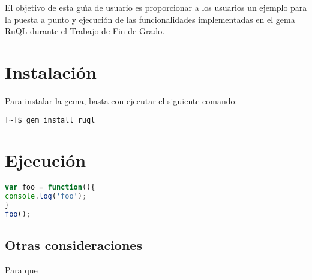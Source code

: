 El objetivo de esta gu\'{\i}a de usuario es proporcionar a los usuarios un ejemplo para la puesta a punto y ejecuci\'on de las 
funcionalidades implementadas en el gema RuQL durante el Trabajo de Fin de Grado.

\section{Instalación}
\label{Apendice2:instalacion}

Para instalar la gema, basta con ejecutar el siguiente comando:
\begin{verbatim}
[~]$ gem install ruql
\end{verbatim}



\section{Ejecución}
\label{Apendice2:ejecucion}

\begin{lstlisting}[language=JavaScript]
var foo = function(){
console.log('foo');
}
foo();
\end{lstlisting}
\bigskip

\subsection{Otras consideraciones}
\label{subsec:Apendice2.1}

Para que